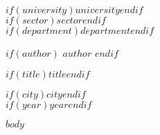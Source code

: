 \documentclass[a4paper,$if(font-size)$$font-size$$endif$]{article}
\begin{document}

\singlespacing

\pagestyle{empty}

\begin{center}

\large
\textbf{$if(university)$$university$$endif$}\\
\textbf{$if(sector)$$sector$$endif$}\\
\textbf{$if(department)$$department$$endif$}

\vspace{4cm}
$if(author)$
$author$
$endif$

\vspace{5cm}
\Large
\textbf{$if(title)$$title$$endif$}

\large
$if(city)$$city$$endif$\\
$if(year)$$year$$endif$

\end{center}

\pagebreak

\clearpage\mbox{}\clearpage

\normalsize
\onehalfspacing

\pagebreak

\tableofcontents

\pagebreak

\pagestyle{plain} %

$body$
\end{document}
